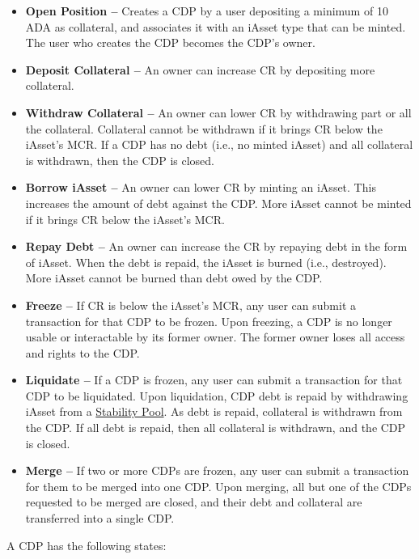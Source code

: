 \documentclass{article}
\begin{document}
\begin{sloppypar}
\begin{itemize}
\item
  \textbf{Open Position --} Creates a CDP by a user depositing a minimum
  of 10 ADA as collateral, and associates it with an iAsset type that
  can be minted. The user who creates the CDP becomes the CDP's owner.
\item
  \textbf{Deposit Collateral --} An owner can increase CR by depositing
  more collateral.
\item
  \textbf{Withdraw Collateral --} An owner can lower CR by withdrawing
  part or all the collateral. Collateral cannot be withdrawn if it
  brings CR below the iAsset's MCR. If a CDP has no debt (i.e., no
  minted iAsset) and all collateral is withdrawn, then the CDP is
  closed.
\item
  \textbf{Borrow iAsset --} An owner can lower CR by minting an iAsset.
  This increases the amount of debt against the CDP. More iAsset cannot
  be minted if it brings CR below the iAsset's MCR.
\item
  \textbf{Repay Debt --} An owner can increase the CR by repaying debt
  in the form of iAsset. When the debt is repaid, the iAsset is burned
  (i.e., destroyed). More iAsset cannot be burned than debt owed by the
  CDP.
\item
  \textbf{Freeze --} If CR is below the iAsset's MCR, any user can
  submit a transaction for that CDP to be frozen. Upon freezing, a CDP
  is no longer usable or interactable by its former owner. The former
  owner loses all access and rights to the CDP.
\item
  \textbf{Liquidate --} If a CDP is frozen, any user can submit a
  transaction for that CDP to be liquidated. Upon liquidation, CDP debt
  is repaid by withdrawing iAsset from a
  \protect\hyperlink{stability-pools}{Stability Pool}. As debt is
  repaid, collateral is withdrawn from the CDP. If all debt is repaid,
  then all collateral is withdrawn, and the CDP is closed.
\item
  \textbf{Merge --} If two or more CDPs are frozen, any user can submit
  a transaction for them to be merged into one CDP. Upon merging, all
  but one of the CDPs requested to be merged are closed, and their debt
  and collateral are transferred into a single CDP.
\end{itemize}

A CDP has the following states:


\end{sloppypar}
\end{document}
